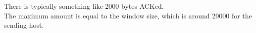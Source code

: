 There is typically something like 2000 bytes ACKed.\\
The maximum amount is equal to the window size, which is around 29000 for the sending host.